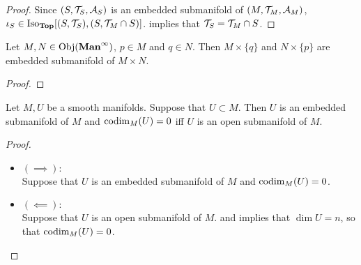 \documentclass{book}
\begin{document}
	\begin{proof}
		Since $(S, \mathcal{T}_S, \mathcal{A}_S)$ is an embedded submanifold of $(M, \mathcal{T}_M, \mathcal{A}_M)$, $\iota_S \in \operatorname{Iso}_{\operatorname*{\text{\textbf{Top}}}}[(S, \mathcal{T}_S), (S, \mathcal{T}_M \cap S)]$.  implies that $\mathcal{T}_S = \mathcal{T}_M \cap S$.
	\end{proof}

	\begin{ex} 
		Let $M, N \in \operatorname{Obj}(\operatorname*{\text{\textbf{Man}}^{\infty}})$, $p \in M$ and $q \in N$. Then $M \times \{q\}$ and $N \times \{p\}$ are embedded submanifold of $M \times N$. 
	\end{ex}

	\begin{proof}
	\end{proof}

	\begin{ex} 
		Let $M, U$ be a smooth manifolds. Suppose that $U \subset M$. Then $U$ is an embedded submanifold of $M$ and $\operatorname{codim}_M(U) = 0$ iff $U$ is an open submanifold of $M$. 
	\end{ex}

	\begin{proof}\
		\begin{itemize}
			\item $(\implies):$ \\
			Suppose that $U$ is an embedded submanifold of $M$ and $\operatorname{codim}_M(U) = 0$. 
			\item $(\impliedby):$ \\
			Suppose that $U$ is an open submanifold of $M$.   and  implies that $\dim U = n$, so that $\operatorname{codim}_M(U) = 0$.
		\end{itemize}
	\end{proof}
\end{document}
